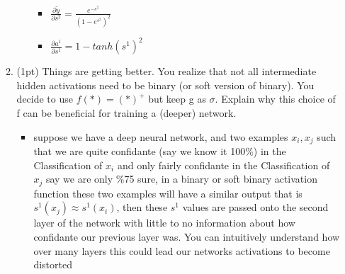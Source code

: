 \documentclass{article}
\begin{document}
\begin{enumerate}[(a)]
\begin{enumerate}
\begin{itemize}
\begin{itemize}
        \item $\frac{\partial \tilde{y}}{\partial s^2}=\frac{e^{-s^2}}{(1-e^{s^2})^2}$
        \item $\frac{\partial a^1}{\partial s^1} =1-tanh(s^1)^2$
    \end{itemize}
\end{itemize}
\item (1pt) Things are getting better. You realize that not all intermediate hidden activations need to be binary (or soft version of binary). You decide to use $f (*) = (*)^+$ but keep g as $\sigma$. Explain why this choice of f can be beneficial for training a (deeper) network.
\begin{itemize}
    \color{blue}
    \item suppose we have a deep neural network, and two examples $x_i, x_j$ such that we are quite confidante (say we know it 100\%) in the Classification of $x_i$  and only fairly confidante in the Classification of $x_j$ say we are only \%75 sure, in a binary or soft binary activation function these two examples will have a similar output that is $s^1(x_j)\approx s^1({x_i})$, then these $s^{1}$ values are passed onto the second layer of the network with little to no information about how confidante our previous layer was. You can intuitively understand how over many layers this could lead our networks activations to become distorted
\end{itemize}
\end{enumerate}
\end{enumerate}
\end{document}
